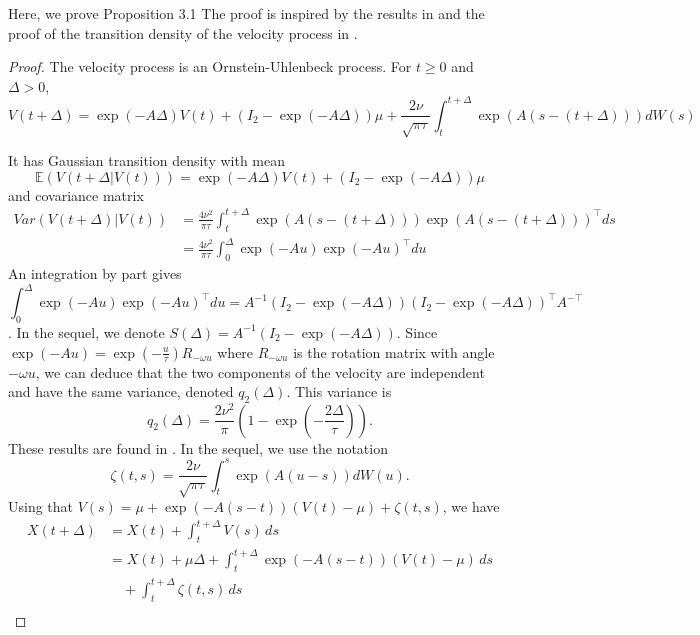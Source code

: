 \documentclass[aoas]{imsart}
\theoremstyle{definition}
\theoremstyle{remark}
\theoremstyle{remark}
\newcommand {\E}{\mathbb{E}}
\newcommand {\1}{\mathbb{1}}
\begin{document}
Here, we prove Proposition 3.1 The proof is inspired by the results in \citep{gurarie_correlated_2017,johnson_continuous_2008} and the proof of the transition density of the velocity process in \citep{albertsen_generalizing_2018}.
\begin{proof}
	The velocity process is an Ornstein-Uhlenbeck process. For $t \geq 0$ and $\Delta >0$,
	\begin{equation}
		V(t+\Delta)=\exp(-A\Delta) V(t)+ (I_2-\exp(-A\Delta))\mu +\frac{2\nu}{\sqrt{\pi \tau}}\int_{t}^{t+\Delta} \exp(A(s-(t+\Delta))) dW(s)
		\label{eq: RACVM solution}
	\end{equation}
	
	It has Gaussian transition density with mean 
	\begin{equation}
		\E(V(t+\Delta \vert V(t)))=\exp(-A\Delta) V(t)+ (I_2-\exp(-A\Delta))\mu 
	\end{equation}
	and covariance matrix 
	\begin{align*}Var(V(t+\Delta) \vert V(t))&=\frac{4\nu^2}{\pi \tau} \int_{t}^{t+\Delta} \exp(A(s-(t+\Delta))) \exp(A(s-(t+\Delta)))^{\top} ds\\
		&=\frac{4\nu^2}{\pi \tau} \int_{0}^{\Delta} \exp(-Au) \exp(-Au)^{\top} du 
	\end{align*}
	An integration by part gives 
	\[\int_{0}^{\Delta} \exp(-Au) \exp(-Au)^{\top} du =A^{-1}(I_2-\exp(-A\Delta))(I_2-\exp(-A\Delta))^\top A^{-\top}\]. In the sequel, we denote $S(\Delta)=A^{-1}(I_2-\exp(-A\Delta))$.
	Since $\exp(-Au)=\exp(-\frac{u}{\tau}) R_{-\omega u}$ where $R_{-\omega u}$ is the rotation matrix with angle $-\omega u$, we can deduce that the two components of the velocity are independent and have the same variance, denoted  $q_2(\Delta)$. This variance is 
	\begin{equation}
		q_2(\Delta)=\frac{2\nu^2}{\pi}\left(1-\exp\left(-\frac{2\Delta}{\tau}\right)\right).
	\end{equation}
	These results are found in \cite{gurarie_correlated_2017}.
	In the sequel, we  use the notation 
	\[\zeta(t,s) =\frac{2\nu}{\sqrt{\pi \tau}}\int_{t}^{s} \exp(A(u-s)) dW(u).\] 
	Using that $V(s)=\mu+\exp(-A(s-t))(V(t)-\mu)+\zeta(t,s)$, we have
\begin{align*}
    X(t+\Delta) &= X(t) + \int_t^{t+\Delta} V(s) \, ds \\
    &= X(t) + \mu \Delta + \int_t^{t+\Delta} \exp(-A(s-t))(V(t) - \mu) \, ds \\
    &\quad + \int_t^{t+\Delta} \zeta(t,s) \, ds \\

\end{align*}
\end{proof}
\end{document}
